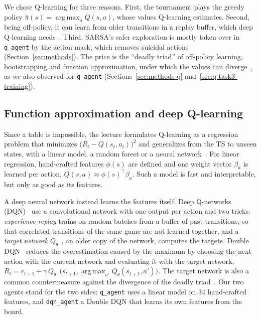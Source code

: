 \documentclass[11pt]{article}
\newcommand{\code}[1]{\texttt{#1}}
\begin{document}
We chose Q-learning for three reasons. First, the tournament plays the greedy policy
$\bar\pi(s) = \operatorname*{arg\,max}_a Q(s,a)$, whose values Q-learning estimates.
Second, being off-policy, it can learn from older transitions in a replay buffer, which
deep Q-learning needs~\cite{mnih2015}. Third, SARSA's safer exploration is mostly taken
over in \code{q\_agent} by the action mask, which removes suicidal actions
(Section~\ref{sec:methods}). The price is the ``deadly triad'' of off-policy learning,
bootstrapping and function approximation, under which the values can
diverge~\cite{sutton2018,vanhasselt2018}, as we also observed for \code{q\_agent}
(Sections~\ref{sec:methods-q} and~\ref{sec:q-task3-training}).

 
\subsection{Function approximation and deep Q-learning}
\label{sec:bg-dqn}
 
Since a table is impossible, the lecture formulates Q-learning as a regression problem
that minimizes $\bigl(R_t - Q(s_t,a_t)\bigr)^2$ and generalizes from the TS to unseen
states, with a linear model, a random forest or a neural network~\cite{koethe2026mle}. For
linear regression, hand-crafted features $\phi(s)$ are defined and one weight vector
$\beta_a$ is learned per action, $Q(s,a) \approx \phi(s)^\top \beta_a$. Such a model is
fast and interpretable, but only as good as its features.
 
A deep neural network instead learns the features itself. Deep Q-networks
(DQN)~\cite{mnih2015} use a convolutional network with one output per action and two
tricks: \emph{experience replay} trains on random batches from a buffer of past
transitions, so that correlated transitions of the same game are not learned together,
and a \emph{target network} $Q_{\theta^-}$, an older copy of the network, computes the
targets. Double DQN~\cite{vanhasselt2016} reduces the overestimation caused by the maximum
by choosing the next action with the current network and evaluating it with the target
network, $R_t = r_{t+1} + \gamma\, Q_{\theta^-}\bigl(s_{t+1},
\operatorname*{arg\,max}_{a'} Q_\theta(s_{t+1},a')\bigr)$. The target network is also a
common countermeasure against the divergence of the deadly triad~\cite{vanhasselt2018}. Our two
agents stand for the two sides: \code{q\_agent} uses a linear model on 34 hand-crafted
features, and \code{dqn\_agent} a Double DQN that learns its own features from the board.
 
\end{document}
